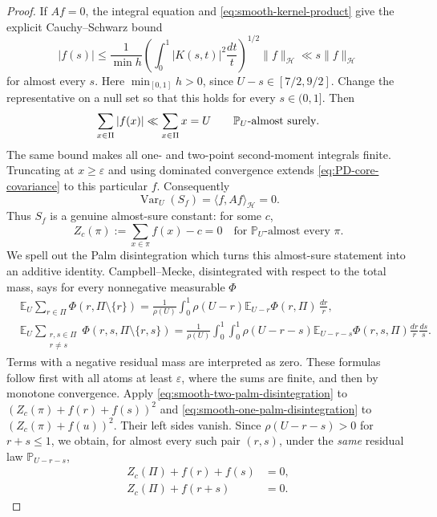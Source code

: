 \documentclass[11pt]{article}
\numberwithin{equation}{section}
\theoremstyle{definition}
\theoremstyle{remark}
\newcommand{\1}{\mathbf 1}
\begin{document}
\begin{proof}
If \(Af=0\), the integral equation and
\eqref{eq:smooth-kernel-product} give the explicit Cauchy--Schwarz bound
\begin{equation}
 |f(s)|\leq \frac1{\min h}
 \left(\int_0^1|K(s,t)|^2\frac{dt}{t}\right)^{1/2}
 \|f\|_{\mathcal H}
 \ll s\|f\|_{\mathcal H}
 \label{eq:PD-kernel-pointwise-control}
\end{equation}
for almost every \(s\).  Here \(\min_{[0,1]}h>0\), since
\(U-s\in[7/2,9/2]\).  Change the
representative on a null set so that this holds for every \(s\in(0,1]\).
Then
\[
 \sum_{x\in\Pi}|f(x)|\ll\sum_{x\in\Pi}x=U
 \qquad\mathbb P_U\hbox{-almost surely}.
\]
The same bound makes all one- and two-point second-moment integrals finite.
Truncating at \(x\geq\varepsilon\) and using dominated convergence extends
\eqref{eq:PD-core-covariance} to this particular \(f\).  Consequently
\[
 \operatorname{Var}_U(S_f)=\langle f,Af\rangle_{\mathcal H}=0.
\]
Thus \(S_f\) is a genuine almost-sure constant: for some \(c\),
\[
 Z_c(\pi):=\sum_{x\in\pi}f(x)-c=0
 \quad\text{for }\mathbb P_U\text{-almost every }\pi.
\]
We spell out the Palm disintegration which turns this almost-sure
statement into an additive identity.  Campbell--Mecke, disintegrated with
respect to the total mass, says for every nonnegative measurable
\(\Phi\)
\begin{align}
 &\mathbb E_U\sum_{r\in\Pi}
   \Phi(r,\Pi\setminus\{r\})
 =\frac1{\rho(U)}\int_0^1
   \rho(U-r)\mathbb E_{U-r}\Phi(r,\Pi)\,\frac{dr}{r},
 \label{eq:smooth-one-palm-disintegration}\\
 &\mathbb E_U\sum_{\substack{r,s\in\Pi\\r\ne s}}
   \Phi(r,s,\Pi\setminus\{r,s\})
 =\frac1{\rho(U)}\int_0^1\!\int_0^1
   \rho(U-r-s)\mathbb E_{U-r-s}\Phi(r,s,\Pi)
       \frac{dr}{r}\frac{ds}{s}.
 \label{eq:smooth-two-palm-disintegration}
\end{align}
Terms with a negative residual mass are interpreted as zero.  These
formulas follow first with all atoms at least \(\varepsilon\), where the
sums are finite, and then by monotone convergence.  Apply
\eqref{eq:smooth-two-palm-disintegration} to
\((Z_c(\pi)+f(r)+f(s))^2\) and
\eqref{eq:smooth-one-palm-disintegration} to
\((Z_c(\pi)+f(u))^2\).  Their left sides vanish.  Since
\(\rho(U-r-s)>0\) for \(r+s\leq1\), we obtain, for almost every such
pair \((r,s)\), under the \emph{same} residual law
\(\mathbb P_{U-r-s}\),
\begin{align*}
 Z_c(\Pi)+f(r)+f(s)&=0,\\
 Z_c(\Pi)+f(r+s)&=0.
\end{align*}

\end{proof}
\end{document}
